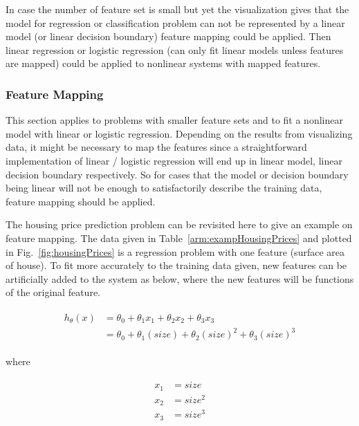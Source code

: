 In case the number of feature set is small but yet the visualization gives that the model for regression or classification problem can not be represented by a linear model (or linear decision boundary) feature mapping could be applied. 
Then linear regression or logistic regression (can only fit linear models unless features are mapped) could be applied to nonlinear systems with mapped features.  

\subsubsection{Feature Mapping}

This section applies to problems with smaller feature sets and to fit a nonlinear model with linear or logistic regression.
Depending on the results from visualizing data, it might be necessary to map the features since a straightforward implementation of linear / logistic regression will end up in linear model, linear decision boundary respectively. 
So for cases that the model or decision boundary being linear will not be enough to satisfactorily describe the training data, feature mapping should be applied.

The housing price prediction problem can be revisited here to give an example on feature mapping.
The data given in Table~\ref{arm:exampHousingPrices} and plotted in Fig.~\ref{fig:housingPrices} is a regression problem with one feature (surface area of house). 
To fit more accurately to the training data given, new features can be artificially added to the system as below, where the new features will be functions of the original feature.

\begin{align}
\label{eqn:costFuncExamp1}
\begin{split}
h_{\theta}(x) & = \theta_0 + \theta_1 x_1 + \theta_2 x_2 + \theta_3 x_3
\\
& = \theta_0 + \theta_1 (size) + \theta_2 {(size)}^2 + \theta_3 {(size)}^3
\end{split}
\end{align}

where

\begin{align}
\label{eqn:featureMapping1}
\begin{split}
x_1 & = size
\\
x_2 & = size^2
\\
x_3 & = size^3
\end{split}
\end{align}

